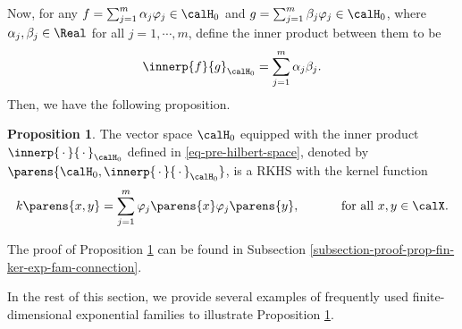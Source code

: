 \documentclass[12pt]{article}
\theoremstyle{definition}
\theoremstyle{theorem}
\newtheorem{proposition}{Proposition}
\theoremstyle{remark}
\begin{document}
Now, for any $f = \sum_{j=1}^m \alpha_j \varphi_j \in \calH_0$ and $g = \sum_{j=1}^m \beta_j \varphi_j \in \calH_0$, where $\alpha_j, \beta_j \in \Real$ for all $j = 1, \cdots, m$, define the inner product between them to be 
\begin{align}\label{eq-pre-hilbert-space}
	\innerp{f}{g}_{\calH_0} = \sum_{j=1}^m \alpha_{j} \beta_{j}. 
\end{align}
Then, we have the following proposition. 

\begin{proposition}\label{prop-fin-ker-exp-fam-connection}
	The vector space $\calH_{0}$ equipped with the inner product $\innerp{\,\cdot\,}{\,\cdot\,}_{\calH_0}$ defined in \eqref{eq-pre-hilbert-space}, denoted by $\parens{\calH_0, \innerp{\,\cdot\,}{\,\cdot\,}_{\calH_0}}$, is a RKHS with the kernel function 
	\begin{align}\label{eq-m-dim-exp-fam-rk}
		k \parens{x, y} = \sum_{j=1}^m \varphi_j \parens{x} \varphi_j \parens{y}, \qquad \quad \text{ for all } x, y \in \calX. 
	\end{align}
\end{proposition}

The proof of Proposition \ref{prop-fin-ker-exp-fam-connection} can be found in Subsection \ref{subsection-proof-prop-fin-ker-exp-fam-connection}. 

In the rest of this section, we provide several examples of frequently used finite-dimensional exponential families to illustrate Proposition \ref{prop-fin-ker-exp-fam-connection}. 
\end{document}
